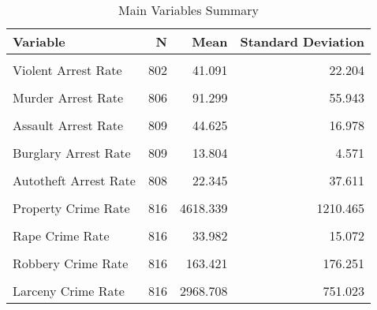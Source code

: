 \begin{table}[H]

\caption{\label{tab:tab:replicatetable2a}Main Variables Summary}
\centering
\begin{tabular}[t]{lrrr}
\toprule
Variable & N & Mean & Standard Deviation\\
\midrule
\cellcolor{gray!6}{Shalll} & \cellcolor{gray!6}{816} & \cellcolor{gray!6}{0.191} & \cellcolor{gray!6}{0.393}\\
Violent Arrest Rate & 802 & 41.091 & 22.204\\
\cellcolor{gray!6}{Property Arrest Rate} & \cellcolor{gray!6}{809} & \cellcolor{gray!6}{16.918} & \cellcolor{gray!6}{4.677}\\
Murder Arrest Rate & 806 & 91.299 & 55.943\\
\cellcolor{gray!6}{Rape Arrest Rate} & \cellcolor{gray!6}{799} & \cellcolor{gray!6}{41.023} & \cellcolor{gray!6}{17.389}\\
\addlinespace
Assault Arrest Rate & 809 & 44.625 & 16.978\\
\cellcolor{gray!6}{Robery Arrest Rate} & \cellcolor{gray!6}{808} & \cellcolor{gray!6}{31.458} & \cellcolor{gray!6}{13.593}\\
Burglary Arrest Rate & 809 & 13.804 & 4.571\\
\cellcolor{gray!6}{Larceny Arrest Rate} & \cellcolor{gray!6}{809} & \cellcolor{gray!6}{18.537} & \cellcolor{gray!6}{5.196}\\
Autotheft Arrest Rate & 808 & 22.345 & 37.611\\
\addlinespace
\cellcolor{gray!6}{Violent Crime Rate} & \cellcolor{gray!6}{816} & \cellcolor{gray!6}{483.926} & \cellcolor{gray!6}{318.943}\\
Property Crime Rate & 816 & 4618.339 & 1210.465\\
\cellcolor{gray!6}{Murder Crime Rate} & \cellcolor{gray!6}{816} & \cellcolor{gray!6}{7.768} & \cellcolor{gray!6}{6.882}\\
Rape Crime Rate & 816 & 33.982 & 15.072\\
\cellcolor{gray!6}{Assault Crime Rate} & \cellcolor{gray!6}{816} & \cellcolor{gray!6}{278.755} & \cellcolor{gray!6}{159.650}\\
\addlinespace
Robbery Crime Rate & 816 & 163.421 & 176.251\\
\cellcolor{gray!6}{Burglary Crime Rate} & \cellcolor{gray!6}{816} & \cellcolor{gray!6}{1239.336} & \cellcolor{gray!6}{417.758}\\
Larceny Crime Rate & 816 & 2968.708 & 751.023\\

\end{tabular}
\end{table}
